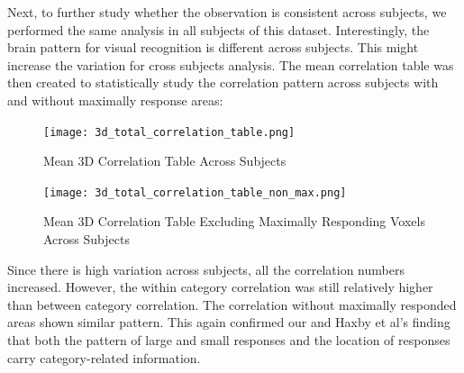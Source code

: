 \documentclass[11pt,twocolumn]{article}
\begin{document}
Next, to further study whether the observation is consistent across subjects,
we performed the same analysis in all subjects of this dataset.
Interestingly, the brain pattern for visual recognition is different across
subjects. This might increase the variation for cross subjects analysis.
The mean correlation table was then created to statistically study the 
correlation pattern across subjects with and without maximally response areas:

\begin{figure}[h!]                                                              
\centering                                                                      
\texttt{[image: 3d\_total\_correlation\_table.png]}                   
\caption{Mean 3D Correlation Table Across Subjects}
\end{figure}                                                                    
                                                                                
\begin{figure}[h!]                                                              
\centering                                                                      
\texttt{[image: 3d\_total\_correlation\_table\_non\_max.png]}           
\caption{Mean 3D Correlation Table Excluding Maximally Responding Voxels Across
Subjects}    
\end{figure} 

Since there is high variation across subjects, all the correlation numbers
increased. However, the within category correlation was still relatively 
higher than between category correlation. The correlation without maximally
responded areas shown similar pattern. This again confirmed our and 
Haxby et al’s finding that both the pattern of   
large and small responses and the location of responses carry category-related  
information.\\
\end{document}
